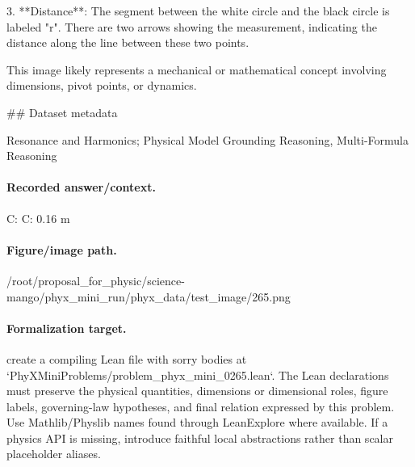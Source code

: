 3. **Distance**: The segment between the white circle and the black circle is labeled "r". There are two arrows showing the measurement, indicating the distance along the line between these two points.

This image likely represents a mechanical or mathematical concept involving dimensions, pivot points, or dynamics.

\#\# Dataset metadata

Resonance and Harmonics; Physical Model Grounding Reasoning, Multi-Formula Reasoning

\paragraph{Recorded answer/context.}
C: C: 0.16 m

\paragraph{Figure/image path.}
/root/proposal\_for\_physic/science-mango/phyx\_mini\_run/phyx\_data/test\_image/265.png

\paragraph{Formalization target.}
create a compiling Lean file with sorry bodies at `PhyXMiniProblems/problem\_phyx\_mini\_0265.lean`. The Lean declarations must preserve the physical quantities, dimensions or dimensional roles, figure labels, governing-law hypotheses, and final relation expressed by this problem.
Use Mathlib/Physlib names found through LeanExplore where available. If a physics API is missing, introduce faithful local abstractions rather than scalar placeholder aliases.

